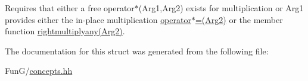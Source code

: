 Requires that either a free operator$\ast$(\-Arg1,\-Arg2) exists for multiplication or Arg1 provides either the in-\/place multiplication \hyperlink{structFunG_1_1Concepts_1_1MultiplicationConcept_ac91bb184ac3641bb86e8cc03497988f4}{operator$\ast$=(\-Arg2)} or the member function \hyperlink{structFunG_1_1Concepts_1_1MultiplicationConcept_aaf1220bf588863cbfe3166f216b8422c}{rightmultiplyany(\-Arg2)}. 

The documentation for this struct was generated from the following file\-:\begin{DoxyCompactItemize}
\item 
Fun\-G/\hyperlink{concepts_8hh}{concepts.\-hh}\end{DoxyCompactItemize}
